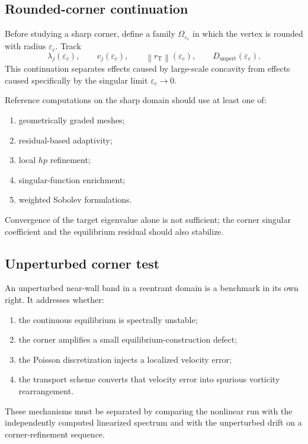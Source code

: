 \documentclass[11pt,a4paper]{article}
\newcommand{\Om}{\Omega}
\newcommand{\norm}[1]{\left\|#1\right\|}
\begin{document}
\subsection{Rounded-corner continuation}

Before studying a sharp corner, define a family $\Om_{\varepsilon_c}$ in which the vertex is rounded with radius $\varepsilon_c$. Track
\begin{equation}
  \lambda_j(\varepsilon_c),
  \qquad
  v_j(\varepsilon_c),
  \qquad
  \norm{r_{\mathrm T}}(\varepsilon_c),
  \qquad
  D_{\mathrm{unpert}}(\varepsilon_c).
  \label{eq:corner-continuation}
\end{equation}
This continuation separates effects caused by large-scale concavity from effects caused specifically by the singular limit $\varepsilon_c\to0$.

Reference computations on the sharp domain should use at least one of:
\begin{enumerate}
  \item geometrically graded meshes;
  \item residual-based adaptivity;
  \item local $hp$ refinement;
  \item singular-function enrichment;
  \item weighted Sobolev formulations.
\end{enumerate}
Convergence of the target eigenvalue alone is not sufficient; the corner singular coefficient and the equilibrium residual should also stabilize.

\subsection{Unperturbed corner test}

An unperturbed near-wall band in a reentrant domain is a benchmark in its own right. It addresses whether:
\begin{enumerate}
  \item the continuous equilibrium is spectrally unstable;
  \item the corner amplifies a small equilibrium-construction defect;
  \item the Poisson discretization injects a localized velocity error;
  \item the transport scheme converts that velocity error into spurious vorticity rearrangement.
\end{enumerate}
These mechanisms must be separated by comparing the nonlinear run with the independently computed linearized spectrum and with the unperturbed drift on a corner-refinement sequence.
\end{document}
